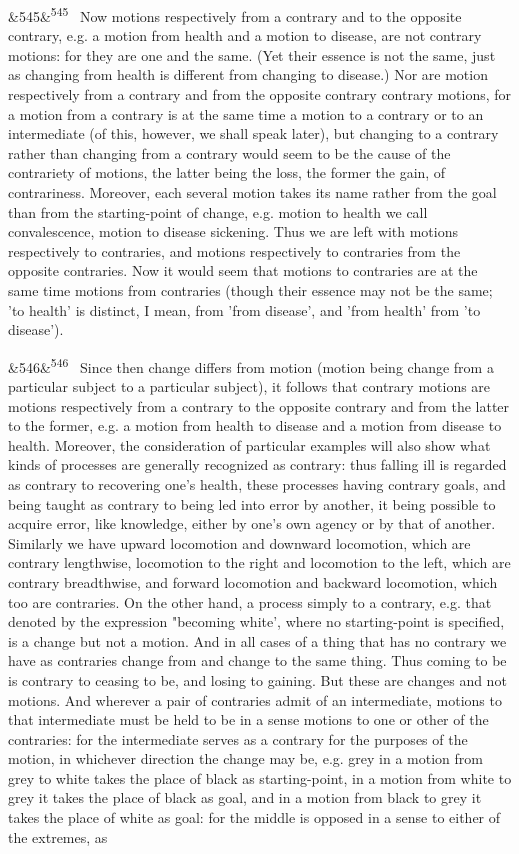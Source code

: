 \documentclass[12pt]{article}
\newcommand{\para}[1][]{\par\noindent\ifx&#1&\else\textsuperscript{\footnotesize #1}~\fi}
\begin{document}
\para[545] Now motions respectively from a contrary and to the opposite contrary, e.g. a motion from health and a motion to disease, are not contrary motions: for they are one and the same. (Yet their essence is not the same, just as changing from health is different from changing to disease.) Nor are motion respectively from a contrary and from the opposite contrary contrary motions, for a motion from a contrary is at the same time a motion to a contrary or to an intermediate (of this, however, we shall speak later), but changing to a contrary rather than changing from a contrary would seem to be the cause of the contrariety of motions, the latter being the loss, the former the gain, of contrariness. Moreover, each several motion takes its name rather from the goal than from the starting-point of change, e.g. motion to health we call convalescence, motion to disease sickening. Thus we are left with motions respectively to contraries, and motions respectively to contraries from the opposite contraries. Now it would seem that motions to contraries are at the same time motions from contraries (though their essence may not be the same; 'to health’ is distinct, I mean, from 'from disease’, and 'from health' from 'to disease’).

\para[546] Since then change differs from motion (motion being change from a particular subject to a particular subject), it follows that contrary motions are motions respectively from a contrary to the opposite contrary and from the latter to the former, e.g. a motion from health to disease and a motion from disease to health. Moreover, the consideration of particular examples will also show what kinds of processes are generally recognized as contrary: thus falling ill is regarded as contrary to recovering one's health, these processes having contrary goals, and being taught as contrary to being led into error by another, it being possible to acquire error, like knowledge, either by one's own agency or by that of another. Similarly we have upward locomotion and downward locomotion, which are contrary lengthwise, locomotion to the right and locomotion to the left, which are contrary breadthwise, and forward locomotion and backward locomotion, which too are contraries. On the other hand, a process simply to a contrary, e.g. that denoted by the expression "becoming white’, where no starting-point is specified, is a change but not a motion. And in all cases of a thing that has no contrary we have as contraries change from and change to the same thing. Thus coming to be is contrary to ceasing to be, and losing to gaining. But these are changes and not motions. And wherever a pair of contraries admit of an intermediate, motions to that intermediate must be held to be in a sense motions to one or other of the contraries: for the intermediate serves as a contrary for the purposes of the motion, in whichever direction the change may be, e.g. grey in a motion from grey to white takes the place of black as starting-point, in a motion from white to grey it takes the place of black as goal, and in a motion from black to grey it takes the place of white as goal: for the middle is opposed in a sense to either of the extremes, as
\end{document}
